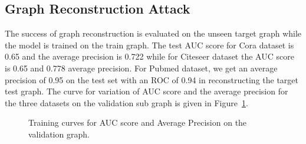 \subsection{Graph Reconstruction Attack}

The success of graph reconstruction is evaluated on the unseen target graph while the model is trained on the train graph.
The test AUC score for Cora dataset is 0.65 and the average precision is 0.722 while for Citeseer dataset the AUC score is 0.65 and 0.778 average precision.
For Pubmed dataset, we get an average precision of 0.95 on the test set with an ROC of 0.94 in reconstructing the target test graph.
The curve for variation of AUC score and the average precision for the three datasets on the validation sub graph is given in Figure~\ref{fig:valgraphrecon}.

\begin{figure}[!htb]
    \centering
    \begin{minipage}[b]{1\linewidth}
    \centering
    \end{minipage}
\vspace{-3mm}
    \caption{Training curves for AUC score and Average Precision on the validation graph.}
    \label{fig:valgraphrecon}
\vspace{-1mm}
\end{figure}

